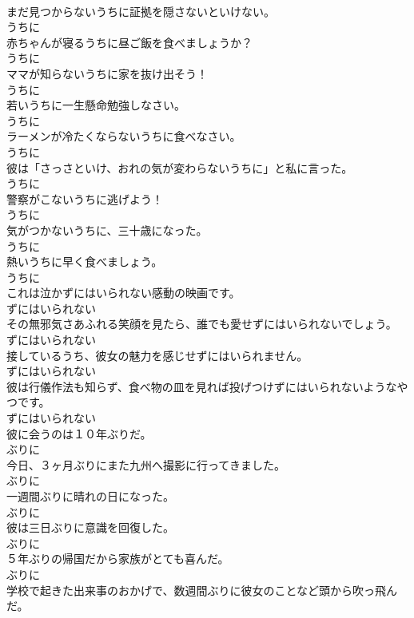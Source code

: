 \documentclass[8pt]{extreport}
\begin{document}
\begin{CJK}{UTF8}{min}
\\	まだ見つからないうちに証拠を隠さないといけない。	
\\	うちに
\\	赤ちゃんが寝るうちに昼ご飯を食べましょうか？	
\\	うちに
\\	ママが知らないうちに家を抜け出そう！	
\\	うちに
\\	若いうちに一生懸命勉強しなさい。	
\\	うちに
\\	ラーメンが冷たくならないうちに食べなさい。	
\\	うちに
\\	彼は「さっさといけ、おれの気が変わらないうちに」と私に言った。	
\\	うちに
\\	警察がこないうちに逃げよう！	
\\	うちに
\\	気がつかないうちに、三十歳になった。	
\\	うちに
\\	熱いうちに早く食べましょう。	
\\	うちに
\\	これは泣かずにはいられない感動の映画です。	
\\	ずにはいられない
\\	その無邪気さあふれる笑顔を見たら、誰でも愛せずにはいられないでしょう。	
\\	ずにはいられない
\\	接しているうち、彼女の魅力を感じせずにはいられません。	
\\	ずにはいられない
\\	彼は行儀作法も知らず、食べ物の皿を見れば投げつけずにはいられないようなやつです。	
\\	ずにはいられない
\\	彼に会うのは１０年ぶりだ。	
\\	ぶりに
\\	今日、３ヶ月ぶりにまた九州へ撮影に行ってきました。	
\\	ぶりに
\\	一週間ぶりに晴れの日になった。	
\\	ぶりに
\\	彼は三日ぶりに意識を回復した。	
\\	ぶりに
\\	５年ぶりの帰国だから家族がとても喜んだ。	
\\	ぶりに
\\	学校で起きた出来事のおかげで、数週間ぶりに彼女のことなど頭から吹っ飛んだ。	

\end{CJK}
\end{document}
